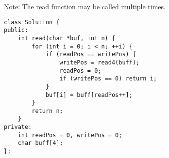 Note: The read function may be called multiple times. \\

\begin{lstlisting}
class Solution {
public:
    int read(char *buf, int n) {
        for (int i = 0; i < n; ++i) {
            if (readPos == writePos) {
                writePos = read4(buff);
                readPos = 0;
                if (writePos == 0) return i;
            }
            buf[i] = buff[readPos++];
        }
        return n;
    }
private:
    int readPos = 0, writePos = 0;
    char buff[4];
};
\end{lstlisting}
